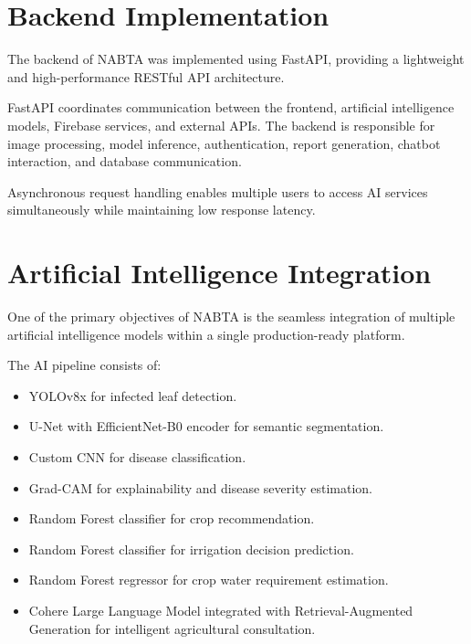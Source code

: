 \section{Backend Implementation}
\label{sec:backend}

The backend of NABTA was implemented using FastAPI, providing a lightweight and high-performance RESTful API architecture.

FastAPI coordinates communication between the frontend, artificial intelligence models, Firebase services, and external APIs. The backend is responsible for image processing, model inference, authentication, report generation, chatbot interaction, and database communication.

Asynchronous request handling enables multiple users to access AI services simultaneously while maintaining low response latency.

\section{Artificial Intelligence Integration}
\label{sec:ai_integration}

One of the primary objectives of NABTA is the seamless integration of multiple artificial intelligence models within a single production-ready platform.

The AI pipeline consists of:

\begin{itemize}
\item YOLOv8x for infected leaf detection.
\item U-Net with EfficientNet-B0 encoder for semantic segmentation.
\item Custom CNN for disease classification.
\item Grad-CAM for explainability and disease severity estimation.
\item Random Forest classifier for crop recommendation.
\item Random Forest classifier for irrigation decision prediction.
\item Random Forest regressor for crop water requirement estimation.
\item Cohere Large Language Model integrated with Retrieval-Augmented Generation for intelligent agricultural consultation.
\end{itemize}

